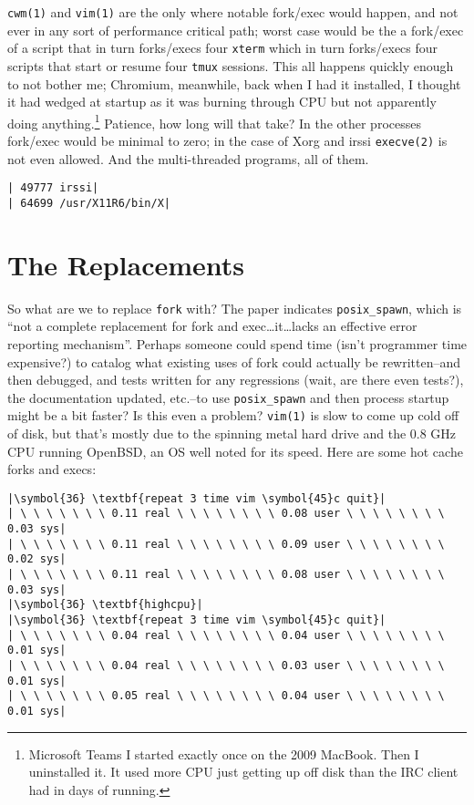 \documentclass[10pt,a4paper]{article}
\begin{document}
\texttt{cwm(1)} and \texttt{vim(1)} are the only where notable fork/exec
would happen, and not ever in any sort of performance critical path;
worst case would be the a fork/exec of a script that in turn forks/execs
four \texttt{xterm} which in turn forks/execs four scripts that start or
resume four \texttt{tmux} sessions. This all happens quickly enough to
not bother me; Chromium, meanwhile, back when I had it installed, I
thought it had wedged at startup as it was burning through CPU but not
apparently doing anything.\footnote{Microsoft Teams I started exactly
once on the 2009 MacBook. Then I uninstalled it. It used more CPU just
getting up off disk than the IRC client had in days of running.}
Patience, how long will that take? In the other processes fork/exec
would be minimal to zero; in the case of Xorg and irssi
\texttt{execve(2)} is not even allowed. And the multi-threaded programs,
all of them.

\begin{lstlisting}
| 49777 irssi|
| 64699 /usr/X11R6/bin/X|
\end{lstlisting}

\section*{The Replacements}

So what are we to replace \texttt{fork} with? The paper indicates
\texttt{posix\_spawn}, which is ``not a complete replacement for fork
and exec\ldots it\ldots lacks an effective error reporting
mechanism''\citep[p.5]{Hotos2019}. Perhaps someone could spend time
(isn't programmer time expensive?) to catalog what existing uses of fork
could actually be rewritten--and then debugged, and tests written for
any regressions (wait, are there even tests?), the documentation
updated, etc.--to use \texttt{posix\_spawn} and then process startup
might be a bit faster? Is this even a problem? \texttt{vim(1)} is slow
to come up cold off of disk, but that's mostly due to the spinning metal
hard drive and the 0.8 GHz CPU running OpenBSD, an OS well noted for its
speed. Here are some hot cache forks and execs:

\begin{lstlisting}
|\symbol{36} \textbf{repeat 3 time vim \symbol{45}c quit}|
| \ \ \ \ \ \ \ 0.11 real \ \ \ \ \ \ \ \ 0.08 user \ \ \ \ \ \ \ \ 0.03 sys|
| \ \ \ \ \ \ \ 0.11 real \ \ \ \ \ \ \ \ 0.09 user \ \ \ \ \ \ \ \ 0.02 sys|
| \ \ \ \ \ \ \ 0.11 real \ \ \ \ \ \ \ \ 0.08 user \ \ \ \ \ \ \ \ 0.03 sys|
|\symbol{36} \textbf{highcpu}|
|\symbol{36} \textbf{repeat 3 time vim \symbol{45}c quit}|
| \ \ \ \ \ \ \ 0.04 real \ \ \ \ \ \ \ \ 0.04 user \ \ \ \ \ \ \ \ 0.01 sys|
| \ \ \ \ \ \ \ 0.04 real \ \ \ \ \ \ \ \ 0.03 user \ \ \ \ \ \ \ \ 0.01 sys|
| \ \ \ \ \ \ \ 0.05 real \ \ \ \ \ \ \ \ 0.04 user \ \ \ \ \ \ \ \ 0.01 sys|
\end{lstlisting}
\end{document}
